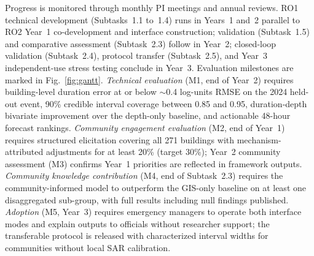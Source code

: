 \documentclass[11pt]{article}
\begin{document}
Progress is monitored through monthly PI meetings and annual reviews. RO1
technical development (Subtasks~1.1 to~1.4) runs in Years~1 and~2 parallel to
RO2 Year~1 co-development and interface construction; validation (Subtask~1.5)
and comparative assessment (Subtask~2.3) follow in Year~2; closed-loop
validation (Subtask~2.4), protocol transfer (Subtask~2.5), and Year~3 independent-use stress
testing conclude in Year~3.
Evaluation milestones are marked in Fig.~\ref{fig:gantt}.
\textit{Technical evaluation} (M1, end of Year~2) requires building-level duration error at or below $\sim$0.4 log-units RMSE on the 2024 held-out event, 90\% credible interval coverage between 0.85 and 0.95, duration-depth bivariate improvement over the depth-only baseline, and actionable 48-hour forecast rankings.
\textit{Community engagement evaluation} (M2, end of Year~1) requires structured elicitation covering all 271 buildings with mechanism-attributed adjustments for at least 20\% (target 30\%); Year~2 community assessment (M3) confirms Year~1 priorities are reflected in framework outputs.
\textit{Community knowledge contribution} (M4, end of Subtask~2.3) requires the community-informed model to outperform the GIS-only baseline on at least one disaggregated sub-group, with full results including null findings published.
\textit{Adoption} (M5, Year~3) requires emergency managers to operate both interface modes and explain outputs to officials without researcher support; the transferable protocol is released with characterized interval widths for communities without local SAR calibration.
\end{document}
